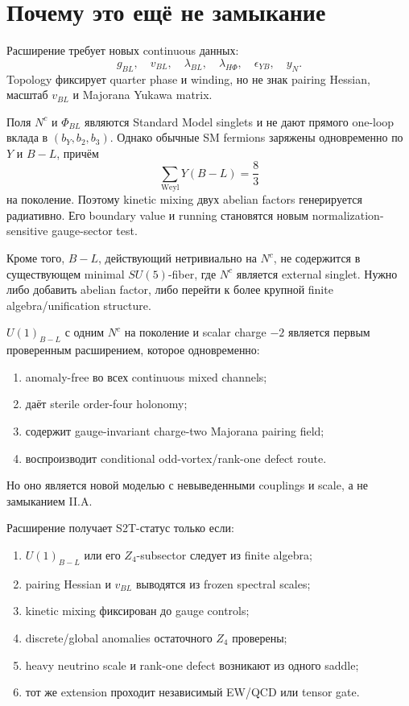 \section{Почему это ещё не замыкание}

Расширение требует новых continuous данных:
\begin{equation}
 g_{BL},\quad v_{BL},\quad\lambda_{BL},\quad
 \lambda_{H\Phi},\quad\epsilon_{YB},\quad y_N.
\end{equation}
Topology фиксирует quarter phase и winding, но не знак pairing Hessian,
масштаб \(v_{BL}\) и Majorana Yukawa matrix.

Поля \(N^c\) и \(\Phi_{BL}\) являются Standard Model singlets и не дают
прямого one-loop вклада в \((b_Y,b_2,b_3)\). Однако обычные SM fermions
заряжены одновременно по \(Y\) и \(B-L\), причём
\begin{equation}
 \sum_{\mathrm{Weyl}}Y(B-L)=\frac83
\end{equation}
на поколение. Поэтому kinetic mixing двух abelian factors генерируется
радиативно. Его boundary value и running становятся новым
normalization-sensitive gauge-sector test.

Кроме того, \(B-L\), действующий нетривиально на \(N^c\), не содержится в
существующем minimal \(SU(5)\)-fiber, где \(N^c\) является external singlet.
Нужно либо добавить abelian factor, либо перейти к более крупной finite
algebra/unification structure.

\begin{proposition}
\(U(1)_{B-L}\) с одним \(N^c\) на поколение и scalar charge \(-2\) является
первым проверенным расширением, которое одновременно:
\begin{enumerate}
 \item anomaly-free во всех continuous mixed channels;
 \item даёт sterile order-four holonomy;
 \item содержит gauge-invariant charge-two Majorana pairing field;
 \item воспроизводит conditional odd-vortex/rank-one defect route.
\end{enumerate}
Но оно является новой моделью с невыведенными couplings и scale, а не
замыканием II.A.
\end{proposition}

\begin{protocol}
Расширение получает S2T-статус только если:
\begin{enumerate}
 \item \(U(1)_{B-L}\) или его \(Z_4\)-subsector следует из finite algebra;
 \item pairing Hessian и \(v_{BL}\) выводятся из frozen spectral scales;
 \item kinetic mixing фиксирован до gauge controls;
 \item discrete/global anomalies остаточного \(Z_4\) проверены;
 \item heavy neutrino scale и rank-one defect возникают из одного saddle;
 \item тот же extension проходит независимый EW/QCD или tensor gate.
\end{enumerate}
\end{protocol}

